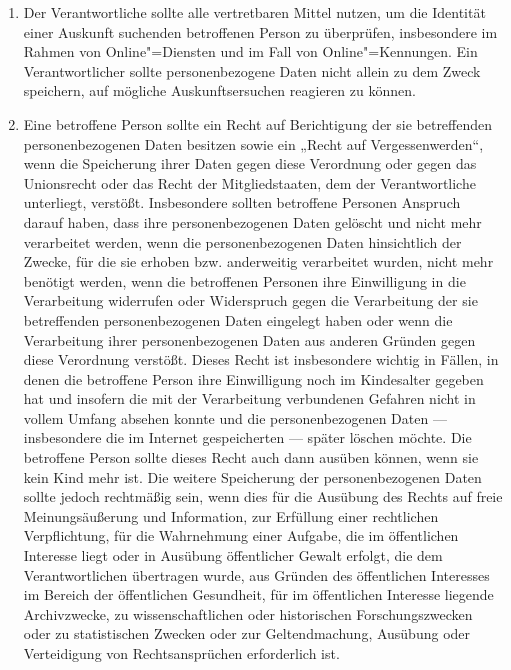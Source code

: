 \begin{enumerate}

   \item Der Verantwortliche sollte alle vertretbaren Mittel nutzen, um die Identität einer Auskunft suchenden
    betroffenen Person zu überprüfen, insbesondere im Rahmen von Online"=Diensten und im Fall von Online"=Kennungen.
    Ein Verantwortlicher sollte personenbezogene Daten nicht allein zu dem Zweck speichern, auf mögliche
    Auskunftsersuchen reagieren zu können.%
   \label{itm:eg-64}
   

   \item Eine betroffene Person sollte ein Recht auf Berichtigung der sie betreffenden personenbezogenen Daten besitzen
    sowie ein „Recht auf Vergessenwerden“, wenn die Speicherung ihrer Daten gegen diese Verordnung oder gegen das
    Unionsrecht oder das Recht der Mitgliedstaaten, dem der Verantwortliche unterliegt, verstößt. Insbesondere sollten
    betroffene Personen Anspruch darauf haben, dass ihre personenbezogenen Daten gelöscht und nicht mehr verarbeitet
    werden, wenn die personenbezogenen Daten hinsichtlich der Zwecke, für die sie erhoben bzw. anderweitig verarbeitet
    wurden, nicht mehr benötigt werden, wenn die betroffenen Personen ihre Einwilligung in die Verarbeitung widerrufen
    oder Widerspruch gegen die Verarbeitung der sie betreffenden personenbezogenen Daten eingelegt haben oder wenn die
    Verarbeitung ihrer personenbezogenen Daten aus anderen Gründen gegen diese Verordnung verstößt. Dieses Recht ist
    insbesondere wichtig in Fällen, in denen die betroffene Person ihre Einwilligung noch im Kindesalter gegeben hat
    und insofern die mit der Verarbeitung verbundenen Gefahren nicht in vollem Umfang absehen konnte und die
    personenbezogenen Daten — insbesondere die im Internet gespeicherten — später löschen möchte. Die betroffene Person
    sollte dieses Recht auch dann ausüben können, wenn sie kein Kind mehr ist. Die weitere Speicherung der
    personenbezogenen Daten sollte jedoch rechtmäßig sein, wenn dies für die Ausübung des Rechts auf freie
    Meinungsäußerung und Information, zur Erfüllung einer rechtlichen Verpflichtung, für die Wahrnehmung einer Aufgabe,
    die im öffentlichen Interesse liegt oder in Ausübung öffentlicher Gewalt erfolgt, die dem Verantwortlichen
    übertragen wurde, aus Gründen des öffentlichen Interesses im Bereich der öffentlichen Gesundheit, für im
    öffentlichen Interesse liegende Archivzwecke, zu wissenschaftlichen oder historischen Forschungszwecken oder zu
    statistischen Zwecken oder zur Geltendmachung, Ausübung oder Verteidigung von Rechtsansprüchen erforderlich ist.%
   \label{itm:eg-65}
   

\end{enumerate}
